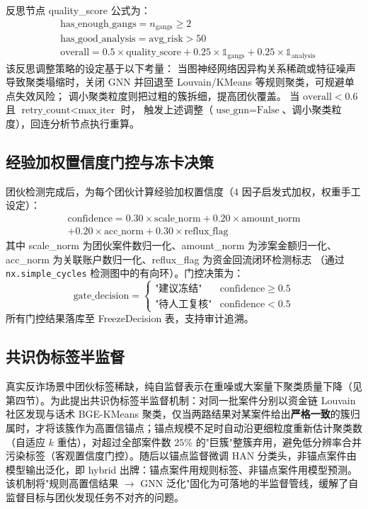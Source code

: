 \documentclass[12pt,a4paper,fontset=windows]{ctexart}
\begin{document}
反思节点 quality\_score 公式为：
\begin{equation}
\label{eq:quality}
\begin{aligned}
&\text{has\_enough\_gangs} = n_{\text{gangs}} \ge 2 \\
&\text{has\_good\_analysis} = \text{avg\_risk} > 50 \\
&\text{overall} = 0.5 \times \text{quality\_score} + 0.25 \times \mathbb{1}_{\text{gangs}} + 0.25 \times \mathbb{1}_{\text{analysis}}
\end{aligned}
\end{equation}
该反思调整策略的设定基于以下考量：
当图神经网络因异构关系稀疏或特征噪声导致聚类塌缩时，关闭 GNN 并回退至 Louvain/KMeans 等规则聚类，可规避单点失效风险；
调小聚类粒度则把过粗的簇拆细，提高团伙覆盖。
当 $\text{overall} < 0.6$ 且 $\text{retry\_count} < \text{max\_iter}$ 时，
触发上述调整（$\text{use\_gnn} = \text{False}$、调小聚类粒度），回连分析节点执行重算。

\subsection{经验加权置信度门控与冻卡决策}

团伙检测完成后，为每个团伙计算经验加权置信度（4 因子启发式加权，权重手工设定）：
\begin{equation}
\begin{aligned}
\text{confidence} = 0.30 \times \text{scale\_norm} + 0.20 \times \text{amount\_norm} \\
+ 0.20 \times \text{acc\_norm} + 0.30 \times \text{reflux\_flag}
\end{aligned}
\end{equation}
其中 scale\_norm 为团伙案件数归一化、amount\_norm 为涉案金额归一化、
acc\_norm 为关联账户数归一化、reflux\_flag 为资金回流闭环检测标志
（通过 \texttt{nx.simple\_cycles} 检测图中的有向环）。门控决策为：
\[
\text{gate\_decision} =
\begin{cases}
\text{"建议冻结"} & \text{confidence} \ge 0.5 \\
\text{"待人工复核"} & \text{confidence} < 0.5
\end{cases}
\]
所有门控结果落库至 FreezeDecision 表，支持审计追溯。

\subsection{共识伪标签半监督}

真实反诈场景中团伙标签稀缺，纯自监督表示在重噪或大案量下聚类质量下降（见第四节）。为此提出共识伪标签半监督机制：对同一批案件分别以资金链 Louvain 社区发现与话术 BGE-KMeans 聚类，仅当两路结果对某案件给出\textbf{严格一致}的簇归属时，才将该簇作为高置信锚点；锚点规模不足时自动沿更细粒度重新估计聚类数（自适应 $k$ 重估），对超过全部案件数 $25\%$ 的"巨簇"整簇弃用，避免低分辨率合并污染标签（客观置信度门控）。随后以锚点监督微调 HAN 分类头，非锚点案件由模型输出泛化，即 hybrid 出牌：锚点案件用规则标签、非锚点案件用模型预测。该机制将"规则高置信结果 $\to$ GNN 泛化"固化为可落地的半监督管线，缓解了自监督目标与团伙发现任务不对齐的问题。
\end{document}
